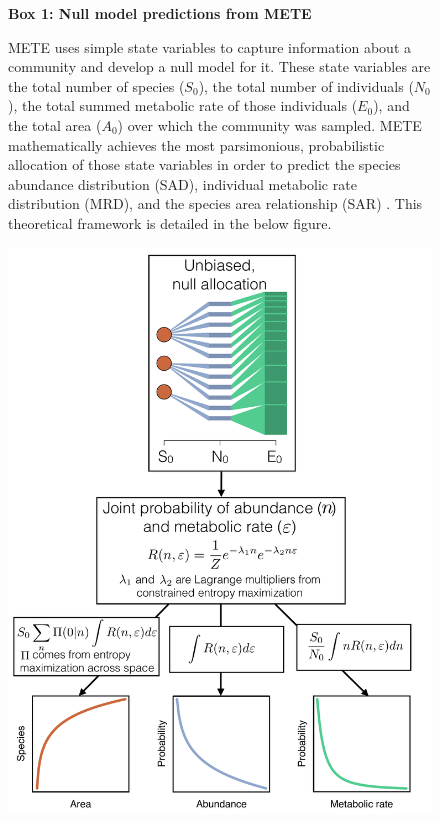 \documentclass[11pt]{article}
\begin{document}
\begin{figure}
\vspace{-5pt}
\colorbox{gray!20}{
  \begin{minipage}{0.55\textwidth}
    \noindent    
    {\bf Box 1: Null model predictions from METE} 
    
    METE uses simple state variables to capture information about a
    community and develop a null model for it.  These state variables
    are the total number of species ($S_0$), the total number of
    individuals ($N_0$), the total summed metabolic rate of those
    individuals ($E_0$), and the total area ($A_0$) over which the
    community was sampled.  METE mathematically achieves the most
    parsimonious, probabilistic allocation of those state variables in
    order to predict the species abundance distribution (SAD),
    individual metabolic rate distribution (MRD), and the species area
    relationship (SAR) \citep{harte2011}. This theoretical framework
    is detailed in the below figure.
    
    \begin{center}
      \includegraphics[scale=0.325]{../figs/fig_meteFramework.pdf}
    \end{center}
    \vspace{2pt}
  \end{minipage}
}
\vspace{-5pt}
\end{figure}
\end{document}
